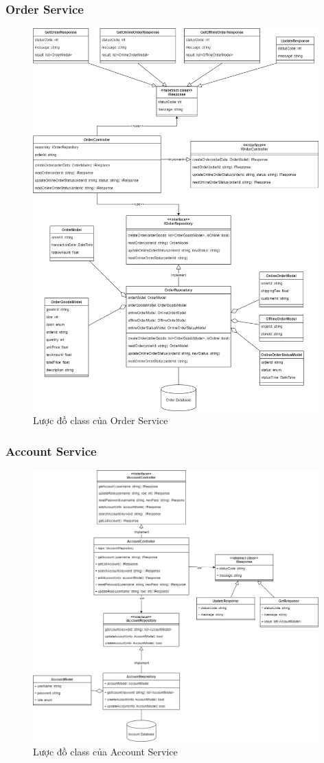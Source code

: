 \subsubsection{Order Service}
\begin{figure}[!htp]
	\centering
	\includegraphics[width=11cm]{img/Architecture/service/OrderService.png}
	\newline
	\caption{Lược đồ class của Order Service}
\end{figure}



\subsubsection{Account Service}
\begin{figure}[!htp]
	\centering
	\includegraphics[width=11cm]{img/Architecture/service/AccountService.png}
	\newline
	\caption{Lược đồ class của Account Service}
\end{figure}

